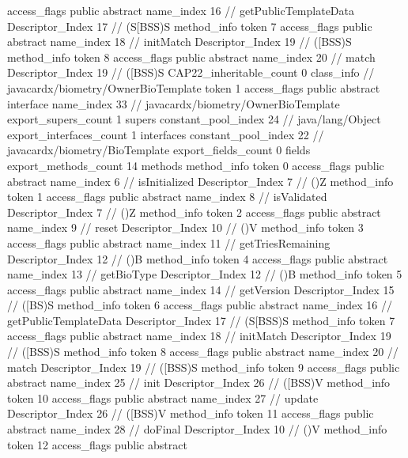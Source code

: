 {{{{{					access_flags	public abstract
					name_index	16		// getPublicTemplateData
					Descriptor_Index	17		// (S[BSS)S
				}
				method_info {
					token	7
					access_flags	public abstract
					name_index	18		// initMatch
					Descriptor_Index	19		// ([BSS)S
				}
				method_info {
					token	8
					access_flags	public abstract
					name_index	20		// match
					Descriptor_Index	19		// ([BSS)S
				}
			}
			CAP22_inheritable_count	0
		}
		class_info {		// javacardx/biometry/OwnerBioTemplate
			token	1
			access_flags	public abstract interface
			name_index	33		// javacardx/biometry/OwnerBioTemplate
			export_supers_count	1
			supers {
				constant_pool_index	24		// java/lang/Object
			}
			export_interfaces_count	1
			interfaces {
				constant_pool_index	22		// javacardx/biometry/BioTemplate
			}
			export_fields_count	0
			fields {
			}
			export_methods_count	14
			methods {
				method_info {
					token	0
					access_flags	public abstract
					name_index	6		// isInitialized
					Descriptor_Index	7		// ()Z
				}
				method_info {
					token	1
					access_flags	public abstract
					name_index	8		// isValidated
					Descriptor_Index	7		// ()Z
				}
				method_info {
					token	2
					access_flags	public abstract
					name_index	9		// reset
					Descriptor_Index	10		// ()V
				}
				method_info {
					token	3
					access_flags	public abstract
					name_index	11		// getTriesRemaining
					Descriptor_Index	12		// ()B
				}
				method_info {
					token	4
					access_flags	public abstract
					name_index	13		// getBioType
					Descriptor_Index	12		// ()B
				}
				method_info {
					token	5
					access_flags	public abstract
					name_index	14		// getVersion
					Descriptor_Index	15		// ([BS)S
				}
				method_info {
					token	6
					access_flags	public abstract
					name_index	16		// getPublicTemplateData
					Descriptor_Index	17		// (S[BSS)S
				}
				method_info {
					token	7
					access_flags	public abstract
					name_index	18		// initMatch
					Descriptor_Index	19		// ([BSS)S
				}
				method_info {
					token	8
					access_flags	public abstract
					name_index	20		// match
					Descriptor_Index	19		// ([BSS)S
				}
				method_info {
					token	9
					access_flags	public abstract
					name_index	25		// init
					Descriptor_Index	26		// ([BSS)V
				}
				method_info {
					token	10
					access_flags	public abstract
					name_index	27		// update
					Descriptor_Index	26		// ([BSS)V
				}
				method_info {
					token	11
					access_flags	public abstract
					name_index	28		// doFinal
					Descriptor_Index	10		// ()V
				}
				method_info {
					token	12
					access_flags	public abstract
}}}}}
